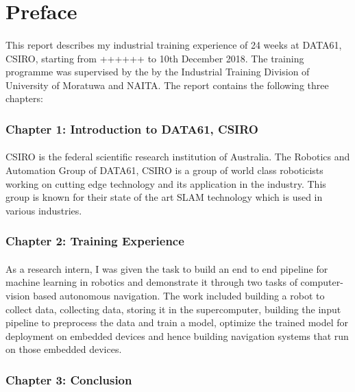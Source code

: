 \section*{Preface}

\paragraph{}
This report describes my industrial training experience of 24 weeks at DATA61, CSIRO, starting from ++++++ to 10th December 2018. The training programme was supervised by the by the Industrial Training Division of University of Moratuwa and NAITA. The report contains the following three chapters:

\subsubsection*{Chapter 1: Introduction to DATA61, CSIRO}
\paragraph{}
CSIRO is the federal scientific research institution of Australia. The Robotics and Automation Group of DATA61, CSIRO is a group of world class roboticists working on cutting edge technology and its application in the industry. This group is known for their state of the art SLAM technology which is used in various industries. 

\subsubsection*{Chapter 2: Training Experience}
\paragraph{}
As a research intern, I was given the task to build an end to end pipeline for machine learning in robotics and demonstrate it through two tasks of computer-vision based autonomous navigation. The work included building a robot to collect data, collecting data, storing it in the supercomputer, building the input pipeline to preprocess the data and  train a model, optimize the trained model for deployment on embedded devices and hence building navigation systems that run on those embedded devices.

\subsubsection*{Chapter 3: Conclusion}
